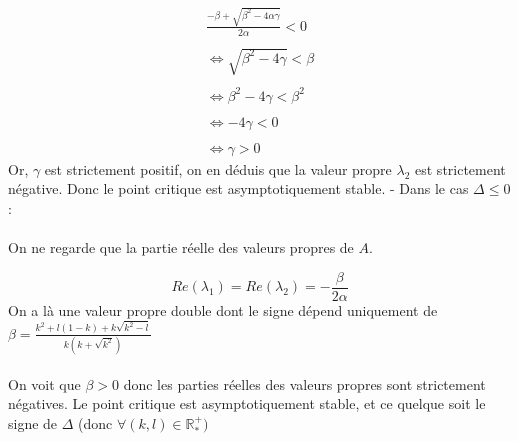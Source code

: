 \documentclass{article}
\begin{document}
\begin{equation*}
    \begin{array}{ll}
        \frac{- \beta + \sqrt{\beta^{2} - 4 \alpha \gamma}}{2\alpha} < 0 \\ \\
        \iff \sqrt{\beta^{2} - 4 \gamma } < \beta \\ \\ \iff
        \beta^{2} - 4 \gamma < \beta^{2} \\\\ \iff
        -4 \gamma < 0 \\\\ \iff
        \gamma > 0 
    \end{array}
\end{equation*}
Or, $\gamma$ est strictement positif, on en déduis que la valeur propre $\lambda_{2}$ est strictement négative. Donc le point critique est asymptotiquement stable.
\newpage
\noindent
- Dans le cas $\Delta \leqslant 0$ : \\ \\ 
On ne regarde que la partie réelle des valeurs propres de $A$.

\begin{equation*}
    Re (\lambda_{1}) = Re(\lambda_{2}) = - \frac{\beta}{2\alpha} 
\end{equation*}
On a là une valeur propre double dont le signe dépend uniquement de $\beta =  \frac{k^{2} + l(1-k) + k \sqrt{k^{2} - l}}{k(k + \sqrt{k^{2} })}$ \\ \\
On voit que $\beta > 0$ donc les parties réelles des valeurs propres sont strictement négatives. Le point critique est asymptotiquement stable, et ce quelque soit le signe de $\Delta $ (donc $ \forall  (k,l)\in \mathbb{R}^{+}_{*})$\\\\
\end{document}
